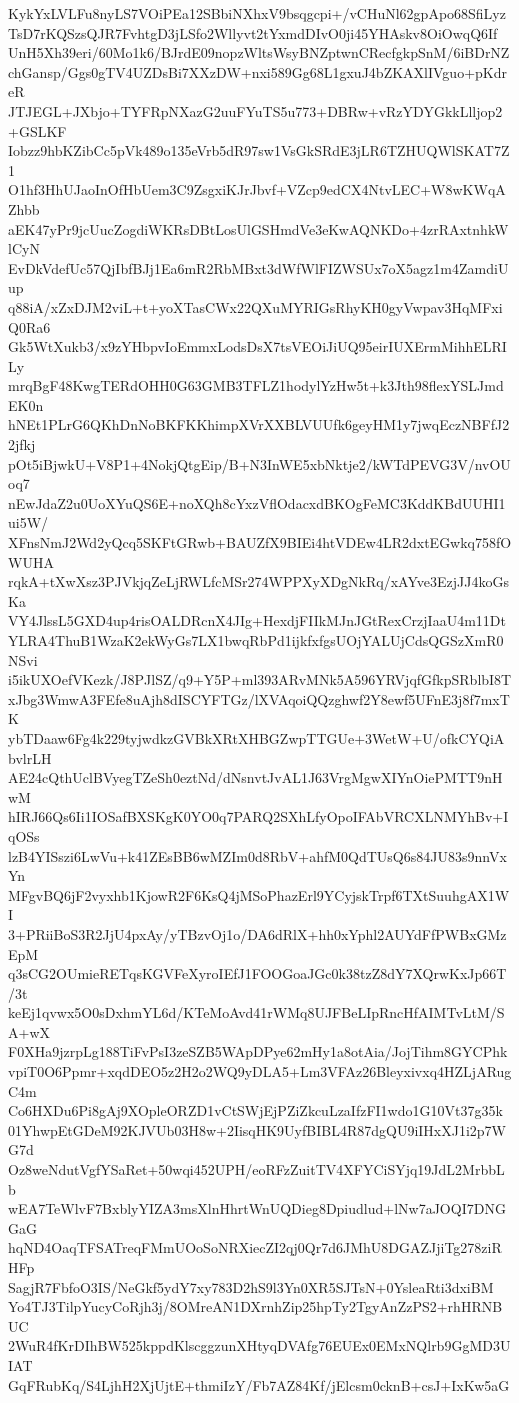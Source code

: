 KykYxLVLFu8nyLS7VOiPEa12SBbiNXhxV9bsqgcpi+/vCHuNl62gpApo68SfiLyz
TsD7rKQSzsQJR7FvhtgD3jLSfo2Wllyvt2tYxmdDIvO0ji45YHAskv8OiOwqQ6If
UnH5Xh39eri/60Mo1k6/BJrdE09nopzWltsWsyBNZptwnCRecfgkpSnM/6iBDrNZ
chGansp/Ggs0gTV4UZDsBi7XXzDW+nxi589Gg68L1gxuJ4bZKAXlIVguo+pKdreR
JTJEGL+JXbjo+TYFRpNXazG2uuFYuTS5u773+DBRw+vRzYDYGkkLlljop2+GSLKF
Iobzz9hbKZibCc5pVk489o135eVrb5dR97sw1VsGkSRdE3jLR6TZHUQWlSKAT7Z1
O1hf3HhUJaoInOfHbUem3C9ZsgxiKJrJbvf+VZcp9edCX4NtvLEC+W8wKWqAZhbb
aEK47yPr9jcUucZogdiWKRsDBtLosUlGSHmdVe3eKwAQNKDo+4zrRAxtnhkWlCyN
EvDkVdefUc57QjIbfBJj1Ea6mR2RbMBxt3dWfWlFIZWSUx7oX5agz1m4ZamdiUup
q88iA/xZxDJM2viL+t+yoXTasCWx22QXuMYRIGsRhyKH0gyVwpav3HqMFxiQ0Ra6
Gk5WtXukb3/x9zYHbpvIoEmmxLodsDsX7tsVEOiJiUQ95eirIUXErmMihhELRILy
mrqBgF48KwgTERdOHH0G63GMB3TFLZ1hodylYzHw5t+k3Jth98flexYSLJmdEK0n
hNEt1PLrG6QKhDnNoBKFKKhimpXVrXXBLVUUfk6geyHM1y7jwqEczNBFfJ22jfkj
pOt5iBjwkU+V8P1+4NokjQtgEip/B+N3InWE5xbNktje2/kWTdPEVG3V/nvOUoq7
nEwJdaZ2u0UoXYuQS6E+noXQh8cYxzVflOdacxdBKOgFeMC3KddKBdUUHI1ui5W/
XFnsNmJ2Wd2yQcq5SKFtGRwb+BAUZfX9BIEi4htVDEw4LR2dxtEGwkq758fOWUHA
rqkA+tXwXsz3PJVkjqZeLjRWLfcMSr274WPPXyXDgNkRq/xAYve3EzjJJ4koGsKa
VY4JlssL5GXD4up4risOALDRcnX4JIg+HexdjFIIkMJnJGtRexCrzjIaaU4m11Dt
YLRA4ThuB1WzaK2ekWyGs7LX1bwqRbPd1ijkfxfgsUOjYALUjCdsQGSzXmR0NSvi
i5ikUXOefVKezk/J8PJlSZ/q9+Y5P+ml393ARvMNk5A596YRVjqfGfkpSRblbI8T
xJbg3WmwA3FEfe8uAjh8dISCYFTGz/lXVAqoiQQzghwf2Y8ewf5UFnE3j8f7mxTK
ybTDaaw6Fg4k229tyjwdkzGVBkXRtXHBGZwpTTGUe+3WetW+U/ofkCYQiAbvlrLH
AE24cQthUclBVyegTZeSh0eztNd/dNsnvtJvAL1J63VrgMgwXIYnOiePMTT9nHwM
hIRJ66Qs6Ii1IOSafBXSKgK0YO0q7PARQ2SXhLfyOpoIFAbVRCXLNMYhBv+IqOSs
lzB4YISszi6LwVu+k41ZEsBB6wMZIm0d8RbV+ahfM0QdTUsQ6s84JU83s9nnVxYn
MFgvBQ6jF2vyxhb1KjowR2F6KsQ4jMSoPhazErl9YCyjskTrpf6TXtSuuhgAX1WI
3+PRiiBoS3R2JjU4pxAy/yTBzvOj1o/DA6dRlX+hh0xYphl2AUYdFfPWBxGMzEpM
q3sCG2OUmieRETqsKGVFeXyroIEfJ1FOOGoaJGc0k38tzZ8dY7XQrwKxJp66T/3t
keEj1qvwx5O0sDxhmYL6d/KTeMoAvd41rWMq8UJFBeLIpRncHfAIMTvLtM/SA+wX
F0XHa9jzrpLg188TiFvPsI3zeSZB5WApDPye62mHy1a8otAia/JojTihm8GYCPhk
vpiT0O6Ppmr+xqdDEO5z2H2o2WQ9yDLA5+Lm3VFAz26Bleyxivxq4HZLjARugC4m
Co6HXDu6Pi8gAj9XOpleORZD1vCtSWjEjPZiZkcuLzaIfzFI1wdo1G10Vt37g35k
01YhwpEtGDeM92KJVUb03H8w+2IisqHK9UyfBIBL4R87dgQU9iIHxXJ1i2p7WG7d
Oz8weNdutVgfYSaRet+50wqi452UPH/eoRFzZuitTV4XFYCiSYjq19JdL2MrbbLb
wEA7TeWlvF7BxblyYIZA3msXlnHhrtWnUQDieg8Dpiudlud+lNw7aJOQI7DNGGaG
hqND4OaqTFSATreqFMmUOoSoNRXiecZI2qj0Qr7d6JMhU8DGAZJjiTg278ziRHFp
SagjR7FbfoO3IS/NeGkf5ydY7xy783D2hS9l3Yn0XR5SJTsN+0YsleaRti3dxiBM
Yo4TJ3TilpYucyCoRjh3j/8OMreAN1DXrnhZip25hpTy2TgyAnZzPS2+rhHRNBUC
2WuR4fKrDIhBW525kppdKlscggzunXHtyqDVAfg76EUEx0EMxNQlrb9GgMD3UIAT
GqFRubKq/S4LjhH2XjUjtE+thmiIzY/Fb7AZ84Kf/jElcsm0cknB+csJ+IxKw5aG
